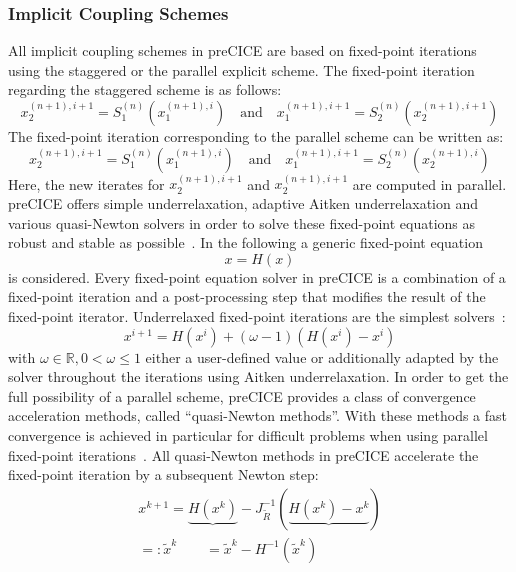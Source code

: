   \subsubsection{Implicit Coupling Schemes}\label{sec:Coupl-Coupling-Implicit}
   All implicit coupling schemes in preCICE are based on fixed-point iterations using the staggered or the parallel explicit scheme. The fixed-point iteration regarding the staggered scheme is as follows:
   \begin{equation}
   x_2^{(n+1),i+1} = S_1^{(n)}\left( x_1^{(n+1),i} \right)\quad \text{and}\quad x_1^{(n+1),i+1} = S_2^{(n)}\left( x_2^{(n+1),i+1} \right)
   \end{equation}
   The fixed-point iteration corresponding to the parallel scheme can be written as:
   \begin{equation}
   x_2^{(n+1),i+1} = S_1^{(n)}\left( x_1^{(n+1),i} \right)\quad \text{and}\quad x_1^{(n+1),i+1} = S_2^{(n)}\left( x_2^{(n+1),i} \right)
   \end{equation}
   Here, the new iterates for $x_2^{(n+1),i+1}$ and $x_2^{(n+1),i+1}$ are computed in parallel. preCICE offers simple underrelaxation, adaptive Aitken underrelaxation and various quasi-Newton solvers in order to solve these fixed-point equations as robust and stable as possible~\cite{bungartz2015fully}. In the following a generic fixed-point equation
   \begin{equation}\label{eq:fixed-point-eq}
   x = H(x)
   \end{equation}
   is considered. Every fixed-point equation solver in preCICE is a combination of a fixed-point iteration and a post-processing step that modifies the result of the fixed-point iterator. Underrelaxed fixed-point iterations are the simplest solvers~\cite{bungartz2015fully}:
   \begin{equation}
   x^{i+1} = H(x^i)+(\omega - 1)\left( H(x^i) - x^i\right)
   \end{equation}
   with $\omega \in \mathbb{R}, 0 < \omega \leq 1$ either a user-defined value or additionally adapted by the solver throughout the iterations using Aitken underrelaxation.
   In order to get the full possibility of a parallel scheme, preCICE provides a class of convergence acceleration methods, called ``quasi-Newton methods''. With these methods a fast convergence is achieved in particular for difficult problems when using parallel fixed-point iterations~\cite{bungartz2015fully}. All quasi-Newton methods in preCICE accelerate the fixed-point iteration by a subsequent Newton step:
   \begin{align}
   x^{k+1} = \underbrace{H(x^k)} - J_{\tilde{R}}^{-1}\left( \underbrace{H(x^k) - x^k}\right) \\
   =: \tilde{x}^k\qquad =\tilde{x}^k - H^{-1}(\tilde{x}^k) \nonumber
   \end{align}
